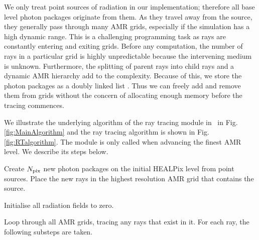 \documentclass[useAMS,usenatbib]{mn2e}
\begin{document}
We only treat point sources of radiation in our implementation;
therefore all base level photon packages originate from them.  As they
travel away from the source, they generally pass through many AMR
grids, especially if the simulation has a high dynamic range.  This is
a challenging programming task as rays are constantly entering and
exiting grids.  Before any computation, the number of rays in a
particular grid is highly unpredictable because the intervening medium
is unknown.  Furthermore, the splitting of parent rays into child rays
and a dynamic AMR hierarchy add to the complexity.  Because of this,
we store the photon packages as a doubly linked list
\citep{Abel02_RT}.  Thus we can freely add and remove them from grids
without the concern of allocating enough memory before the tracing
commences.

\begin{figure*}
  \caption{\label{fig:MainAlgorithm} Flow chart for the overall
    algorithm of the radiative transfer module in \enzo~that
    illustrates (1) the creation of photon packages, (2) ray tracing,
    (3) the transport of photon packages between AMR grids, and (4)
    coupling with the hydrodynamics.  The ray tracing algorithm, which
    is contained in the ``Trace Rays'' is detailed in Fig.
    \ref{fig:RTalgorithm}.}
\end{figure*}

\begin{figure*}
  \caption{\label{fig:RTalgorithm} Flow chart for the ray tracing
    algorithm for one photon passing through a grid.  Note that only
    one step is needed in the routine to adaptively split rays.  The
    remainder is a typical ray tracing method.}
\end{figure*}

We illustrate the underlying algorithm of the ray tracing module in
\enzo~in Fig. \ref{fig:MainAlgorithm} and the ray tracing algorithm
is shown in Fig. \ref{fig:RTalgorithm}.  The module is only called
when advancing the finest AMR level.  We describe its steps below.

 Create $N_{\rm pix}$ new photon packages on the initial
HEALPix level from point sources.  Place the new rays in the highest
resolution AMR grid that contains the source.

 Initialise all radiation fields to zero.

 Loop through all AMR grids, tracing any rays that exist in
it.  For each ray, the following substeps are taken.
\end{document}
